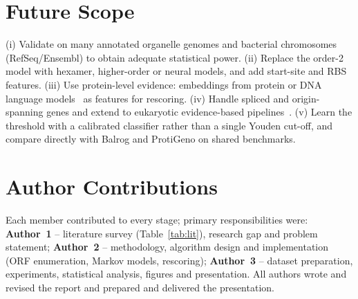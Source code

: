 \section{Future Scope}
(i) Validate on many annotated organelle genomes and bacterial chromosomes (RefSeq/Ensembl) to obtain adequate statistical power. (ii) Replace the order-2 model with hexamer, higher-order or neural models, and add start-site and RBS features. (iii) Use protein-level evidence: embeddings from protein or DNA language models~\cite{zhou2024,tu2023} as features for rescoring. (iv) Handle spliced and origin-spanning genes and extend to eukaryotic evidence-based pipelines~\cite{gabriel2024}. (v) Learn the threshold with a calibrated classifier rather than a single Youden cut-off, and compare directly with Balrog and ProtiGeno on shared benchmarks.

\section*{Author Contributions}
Each member contributed to every stage; primary responsibilities were: \textbf{Author~1} -- literature survey (Table~\ref{tab:lit}), research gap and problem statement; \textbf{Author~2} -- methodology, algorithm design and implementation (ORF enumeration, Markov models, rescoring); \textbf{Author~3} -- dataset preparation, experiments, statistical analysis, figures and presentation. All authors wrote and revised the report and prepared and delivered the presentation.

